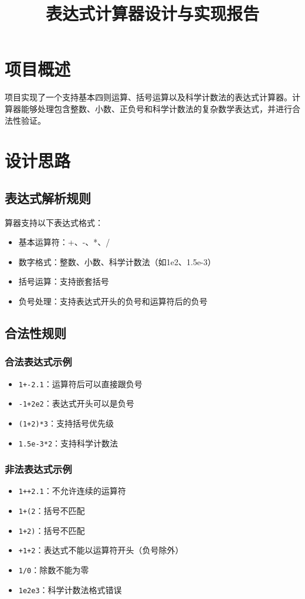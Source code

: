 \documentclass[a4paper,12pt]{article}
\title{表达式计算器设计与实现报告}
\date{}
\begin{document}
\maketitle
\section{项目概述}
项目实现了一个支持基本四则运算、括号运算以及科学计数法的表达式计算器。计算器能够处理包含整数、小数、正负号和科学计数法的复杂数学表达式，并进行合法性验证。
\section{设计思路}
\subsection{表达式解析规则}
算器支持以下表达式格式：
\begin{itemize}
   \item 基本运算符：+、-、*、/
   \item 数字格式：整数、小数、科学计数法（如1e2、1.5e-3）
   \item 括号运算：支持嵌套括号
   \item 负号处理：支持表达式开头的负号和运算符后的负号
\end{itemize}
\subsection{合法性规则}
\subsubsection{合法表达式示例}
\begin{itemize}
   \item \texttt{1+-2.1}：运算符后可以直接跟负号
   \item \texttt{-1+2e2}：表达式开头可以是负号
   \item \texttt{(1+2)*3}：支持括号优先级
   \item \texttt{1.5e-3*2}：支持科学计数法
\end{itemize}
\subsubsection{非法表达式示例}
\begin{itemize}
   \item \texttt{1++2.1}：不允许连续的运算符
   \item \texttt{1+(2}：括号不匹配
   \item \texttt{1+2)}：括号不匹配
   \item \texttt{+1+2}：表达式不能以运算符开头（负号除外）
   \item \texttt{1/0}：除数不能为零
   \item \texttt{1e2e3}：科学计数法格式错误
\end{itemize}
\end{document}

